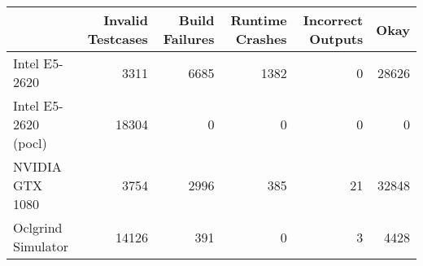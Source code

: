 \begin{tabular}{lrrrrr}
\toprule
{} &  Invalid Testcases &  Build Failures &  Runtime Crashes &  Incorrect Outputs &   Okay \\
\midrule
Intel E5-2620        &               3311 &            6685 &             1382 &                  0 &  28626 \\
Intel E5-2620 (pocl) &              18304 &               0 &                0 &                  0 &      0 \\
NVIDIA GTX 1080      &               3754 &            2996 &              385 &                 21 &  32848 \\
Oclgrind Simulator   &              14126 &             391 &                0 &                  3 &   4428 \\
\bottomrule
\end{tabular}
